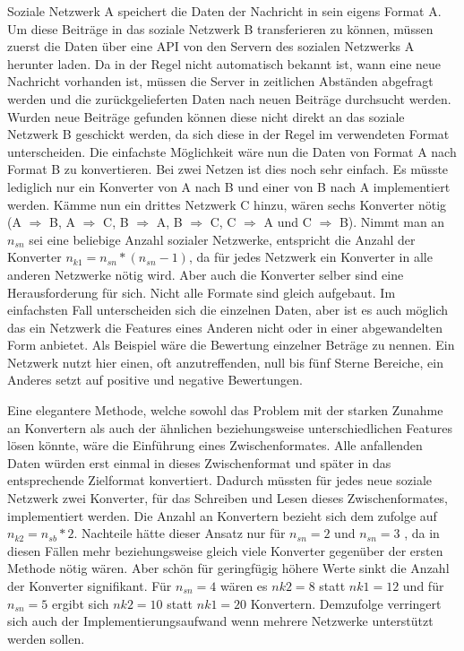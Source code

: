 Soziale Netzwerk A speichert die Daten der Nachricht in sein eigens Format A. Um diese Beiträge in das soziale Netzwerk B transferieren zu können, müssen zuerst die Daten über eine API von den Servern des sozialen Netzwerks A herunter laden. Da in der Regel nicht automatisch bekannt ist, wann eine neue Nachricht vorhanden ist, müssen die Server in zeitlichen Abständen abgefragt werden und die zurückgelieferten Daten nach neuen Beiträge durchsucht werden. Wurden neue Beiträge gefunden können diese nicht direkt an das soziale Netzwerk B geschickt werden, da sich diese in der Regel im verwendeten Format unterscheiden. Die einfachste Möglichkeit wäre nun die Daten von Format A nach Format B zu konvertieren. Bei zwei Netzen ist dies noch sehr einfach. Es müsste lediglich nur ein Konverter von A nach B und einer von B nach A implementiert werden. Kämme nun ein drittes Netzwerk C hinzu, wären sechs Konverter nötig (A $ \Rightarrow $ B, A $ \Rightarrow$  C, B $ \Rightarrow $ A, B $ \Rightarrow $ C, C $ \Rightarrow $ A und C $ \Rightarrow $ B). Nimmt man an $n_{sn}$ sei eine beliebige Anzahl sozialer Netzwerke, entspricht die Anzahl der Konverter $ n_{k1}= n_{sn}*(n_{sn}-1) $, da für jedes Netzwerk ein Konverter in alle anderen Netzwerke nötig wird. Aber auch die Konverter selber sind eine Herausforderung für sich. Nicht alle Formate sind gleich aufgebaut. Im einfachsten Fall unterscheiden sich die einzelnen Daten, aber ist es auch möglich das ein Netzwerk die Features eines Anderen nicht oder in einer abgewandelten Form anbietet. Als Beispiel wäre die Bewertung einzelner Beträge zu nennen. Ein Netzwerk nutzt hier einen, oft anzutreffenden, null bis fünf Sterne Bereiche, ein Anderes setzt auf positive und negative Bewertungen.

\medskip

Eine elegantere Methode, welche sowohl das Problem mit der starken Zunahme an Konvertern als auch der ähnlichen beziehungsweise unterschiedlichen Features lösen könnte, wäre die Einführung eines Zwischenformates. Alle anfallenden Daten würden erst einmal in dieses Zwischenformat und später in das entsprechende Zielformat konvertiert. Dadurch müssten für jedes neue soziale Netzwerk zwei Konverter, für das Schreiben und Lesen dieses Zwischenformates, implementiert werden. Die Anzahl an Konvertern bezieht sich dem zufolge auf $ n_{k2} = n_{sb} * 2 $. Nachteile hätte dieser Ansatz nur für $ n_{sn}=2 $ und $ n_{sn}=3$ , da in diesen Fällen mehr beziehungsweise gleich viele Konverter gegenüber der ersten Methode nötig wären. Aber schön für geringfügig höhere Werte sinkt die Anzahl der Konverter signifikant. Für $ n_{sn} = 4 $ wären es $ n{k2} = 8 $ statt $ n{k1} = 12 $ und für $ n_{sn} = 5 $ ergibt sich $ n{k2} = 10 $ statt $ n{k1} = 20 $ Konvertern. Demzufolge verringert sich auch der Implementierungsaufwand wenn mehrere Netzwerke unterstützt werden sollen.


